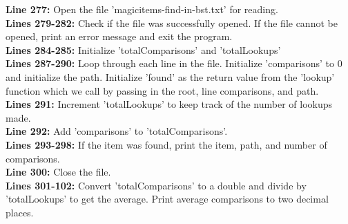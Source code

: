 \documentclass[letterpaper, 10pt,DIV=13]{scrartcl}
\numberwithin{equation}{section} %
\numberwithin{figure}{section} %
\numberwithin{table}{section} %
\begin{document}
\textbf{Line 277:} Open the file 'magicitems-find-in-bst.txt' for reading. \\
\textbf{Lines 279-282:} Check if the file was successfully opened. If the file cannot be opened, print an error message and exit the program. \\
\textbf{Lines 284-285:} Initialize 'totalComparisons' and 'totalLookups' \\
\textbf{Lines 287-290:} Loop through each line in the file. Initialize 'comparisons' to 0 and initialize the path. Initialize 'found' as the return value from the 'lookup' function which we call by passing in the root, line comparisons, and path. \\
\textbf{Lines 291:} Increment 'totalLookups' to keep track of the number of lookups made. \\
\textbf{Line 292:} Add 'comparisons' to 'totalComparisons'. \\
\textbf{Lines 293-298:} If the item was found, print the item, path, and number of comparisons. \\
\textbf{Line 300:} Close the file. \\
\textbf{Lines 301-102:} Convert 'totalComparisons' to a double and divide by 'totalLookups' to get the average. Print average comparisons to two decimal places. \\
\end{document}
